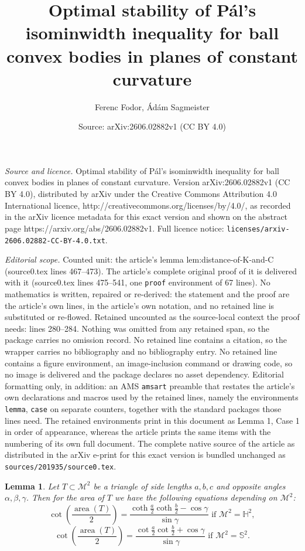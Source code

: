 \documentclass[10pt,a4paper]{amsart}
\title{Optimal stability of P\'al's isominwidth inequality for ball convex bodies in planes of constant curvature}
\author{Ferenc Fodor, \'Ad\'am Sagmeister}
\date{Source: arXiv:2606.02882v1 (CC BY 4.0)}
\newtheorem{lemma}{Lemma}
\newcommand{\M}{\mathcal{M}}
\DeclareMathOperator{\area}{\mathrm{area}}
\newcommand{\hyp}{{\mathbb H}}
\newcommand{\sph}{{\mathbb S}}
\begin{document}
\maketitle

\noindent\emph{Source and licence.} Optimal stability of P\'al's isominwidth inequality for ball convex bodies in planes of constant curvature. Version arXiv:2606.02882v1 (CC BY 4.0), distributed by arXiv under the Creative Commons Attribution 4.0 International licence, http://creativecommons.org/licenses/by/4.0/, as recorded in the arXiv licence metadata for this exact version and shown on the abstract page https://arxiv.org/abs/2606.02882v1. Full licence notice: \texttt{licenses/arxiv-2606.02882-CC-BY-4.0.txt}.\par\smallskip

\noindent\textit{Editorial scope.} Counted unit: the article's lemma lem:distance-of-K-and-C (source0.tex lines 467--473). The article's complete original proof of it is delivered with it (source0.tex lines 475--541, one \texttt{proof} environment of 67 lines). No mathematics is written, repaired or re-derived: the statement and the proof are the article's own lines, in the article's own notation, and no retained line is substituted or re-flowed.  Retained uncounted as the source-local context the proof needs: lines 280--284.  Nothing was omitted from any retained span, so the package carries no omission record.  No retained line contains a citation, so the wrapper carries no bibliography and no bibliography entry.  No retained line contains a figure environment, an image-inclusion command or drawing code, so no image is delivered and the package declares no asset dependency.  Editorial formatting only, in addition: an AMS \texttt{amsart} preamble that restates the article's own declarations and macros used by the retained lines, namely the environments \texttt{lemma}, \texttt{case} on separate counters, together with the standard packages those lines need.  The retained environments print in this document as Lemma 1, Case 1 in order of appearance, whereas the article prints the same items with the numbering of its own full document.  The complete native source of the article as distributed in the arXiv e-print for this exact version is bundled unchanged as \texttt{sources/201935/source0.tex}.
\begin{lemma}\label{lemma:triangle-area}
Let $T\subset\M^2$ be a triangle of side lengths $a,b,c$ and opposite angles $\alpha,\beta,\gamma$. Then for the area of $T$ we have the following equations depending on $\M^2$:
$$\cot\left(\frac{\area\left(T\right)}{2}\right)=\frac{\coth\frac{a}{2}\coth\frac{b}{2}-\cos\gamma}{\sin\gamma}\text{ if }\M^2=\hyp^2,$$
$$\cot\left(\frac{\area\left(T\right)}{2}\right)=\frac{\cot\frac{a}{2}\cot\frac{b}{2}+\cos\gamma}{\sin\gamma}\text{ if }\M^2=\sph^2.$$
\end{lemma}
\end{document}

